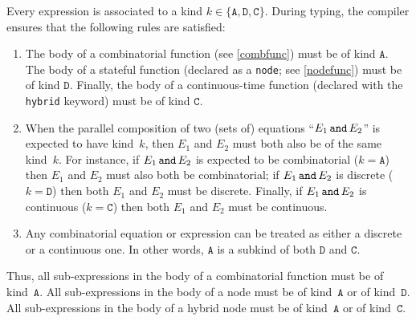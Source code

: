 \documentclass[11pt,titlepage,twoside]{report}
\makeatletter
\newcommand{\zls}[1]{{\@span{class="zelusinline"}#1}}
\newcommand{\zls}[1]{\texttt{#1}}
\renewcommand{\zls}[1]{\texttt{#1}}
\newcommand{\AndEq}[2]{{#1}\,\mbox{{\tt and}}\,{#2}}
\newcommand{\AnyKind}{\ensuremath{\mathtt{A}}}
\newcommand{\NodeKind}{\ensuremath{\mathtt{D}}}
\newcommand{\HybridKind}{\ensuremath{\mathtt{C}}}
\makeatother
\begin{document}
Every expression is associated to a kind $k \in \{\AnyKind, \NodeKind,
\HybridKind\}$. During typing, the compiler ensures that the following rules 
are satisfied:
\begin{enumerate}
\item
The body of a combinatorial function (see \cref{combfunc}) must be of kind 
$\AnyKind$.
The body of a stateful function (declared as a \zls{node}; see 
\cref{nodefunc}) must be of kind $\NodeKind$.
Finally, the body of a continuous-time function (declared with the 
\zls{hybrid} keyword) must be of kind $\HybridKind$. 

\item
When the parallel composition of two (sets of) equations 
``$\AndEq{E_1}{E_2}$'' is expected to have kind~$k$, then $E_1$ and $E_2$ 
must both also be of the same kind~$k$.
For instance, if $\AndEq{E_1}{E_2}$ is expected to be combinatorial ($k = 
\AnyKind$) then $E_1$ and $E_2$ must also both be combinatorial; if 
$\AndEq{E_1}{E_2}$ is discrete ($k = \NodeKind$) then both $E_1$ and $E_2$ 
must be discrete.
Finally, if $\AndEq{E_1}{E_2}$ is continuous ($k = \HybridKind$) then both 
$E_1$ and $E_2$ must be continuous.

\item
Any combinatorial equation or expression can be treated as either a discrete 
or a continuous one.
In other words, $\AnyKind$ is a subkind of both $\NodeKind$ and 
$\HybridKind$.

\end{enumerate}
Thus, all sub-expressions in the body of a combinatorial function must be of 
kind~$\AnyKind$.
All sub-expressions in the body of a node must be of kind~\AnyKind{} or of 
kind~\NodeKind.
All sub-expressions in the body of a hybrid node must be of kind~\AnyKind{} 
or of kind~\HybridKind.
\end{document}
